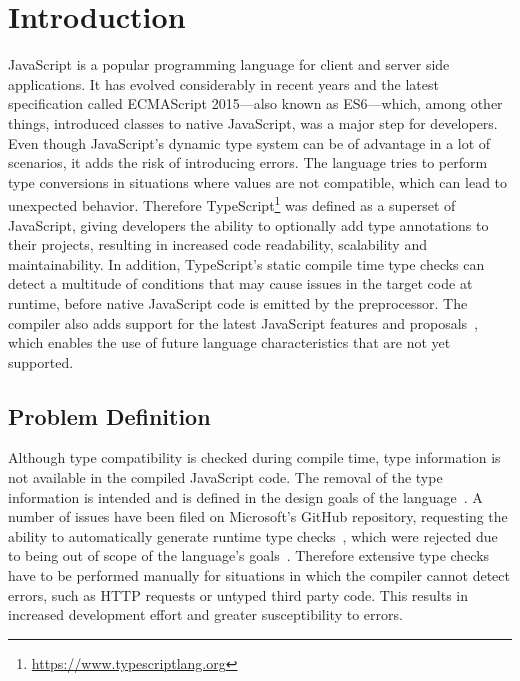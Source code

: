 \chapter{Introduction}
\label{cha:introduction}

JavaScript is a popular programming language for client and server side applications. It has evolved considerably in recent years and the latest specification called ECMAScript 2015---also known as ES6---which, among other things, introduced classes to native JavaScript, was a major step for developers. Even though JavaScript's dynamic type system can be of advantage in a lot of scenarios, it adds the risk of introducing errors. The language tries to perform type conversions in situations where values are not compatible, which can lead to unexpected behavior. Therefore TypeScript\footnote{\url{https://www.typescriptlang.org}} was defined as a superset of JavaScript, giving developers the ability to optionally add type annotations to their projects, resulting in increased code readability, scalability and maintainability. In addition, TypeScript's static compile time type checks can detect a multitude of conditions that may cause issues in the target code at runtime, before native JavaScript code is emitted by the preprocessor. The compiler also adds support for the latest JavaScript features and proposals~\cites{TypeScriptHandbook:CompilerOptions, TypeScriptWebsite}, which enables the use of future language characteristics that are not yet supported.

\section{Problem Definition}
\label{sec:problem-definition}

Although type compatibility is checked during compile time, type information is not available in the compiled JavaScript code. The removal of the type information is intended and is defined in the design goals of the language~\cite{TypeScriptWiki:DesignGoals}. A number of issues have been filed on Microsoft's GitHub repository, requesting the ability to automatically generate runtime type checks~\cites{TypeScriptIssue:RuntimeTypeChecking, TypeScriptIssue:RuntimeTypeChecks, TypeScriptIssue:EmitTypeArguments}, which were rejected due to being out of scope of the language's goals~\cites{TypeScriptIssue:RuntimeTypeChecking:Comment:OutOfScope, TypeScriptIssue:EmitTypeArguments:Comment:OutOfScope}. Therefore extensive type checks have to be performed manually for situations in which the compiler cannot detect errors, such as HTTP requests or untyped third party code. This results in increased development effort and greater susceptibility to errors.

